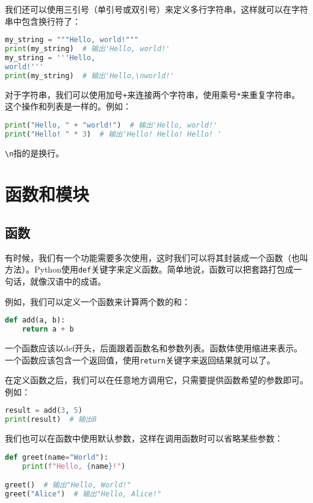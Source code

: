 我们还可以使用三引号（单引号或双引号）来定义多行字符串，这样就可以在字符串中包含换行符了：
\begin{lstlisting}[language=python]
my_string = """Hello, world!"""
print(my_string)  # 输出'Hello, world!'
my_string = '''Hello,
world!'''
print(my_string)  # 输出'Hello,\nworld!'
\end{lstlisting}

对于字符串，我们可以使用加号\texttt{+}来连接两个字符串，使用乘号\texttt{*}来重复字符串。这个操作和列表是一样的。例如：
\begin{lstlisting}[language=python]
print("Hello, " + "world!")  # 输出'Hello, world!'
print("Hello! " * 3)  # 输出'Hello! Hello! Hello! '
\end{lstlisting}

\texttt{\textbackslash n}指的是换行。

\section{函数和模块}\label{sec:functions-and-modules}

\subsection{函数}

有时候，我们有一个功能需要多次使用，这时我们可以将其封装成一个函数（也叫方法）。Python使用\texttt{def}关键字来定义函数。简单地说，函数可以把套路打包成一句话，就像汉语中的成语。

例如，我们可以定义一个函数来计算两个数的和：
\begin{lstlisting}[language=python]
def add(a, b):
    return a + b
\end{lstlisting}

一个函数应该以def开头，后面跟着函数名和参数列表。函数体使用缩进来表示。一个函数应该包含一个返回值，使用\texttt{return}关键字来返回结果就可以了。

在定义函数之后，我们可以在任意地方调用它，只需要提供函数希望的参数即可。例如：
\begin{lstlisting}[language=python]
result = add(3, 5)
print(result)  # 输出8
\end{lstlisting}

我们也可以在函数中使用默认参数，这样在调用函数时可以省略某些参数：
\begin{lstlisting}[language=python]
def greet(name="World"):
    print(f"Hello, {name}!")

greet()  # 输出"Hello, World!"
greet("Alice")  # 输出"Hello, Alice!"
\end{lstlisting}

